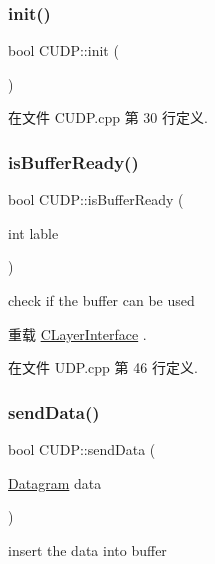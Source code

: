 \subsubsection{\texorpdfstring{init()}{init()}}
{\footnotesize\ttfamily bool C\+U\+D\+P\+::init (\begin{DoxyParamCaption}{ }\end{DoxyParamCaption})}



在文件 C\+U\+D\+P.\+cpp 第 30 行定义.

\mbox{\label{class_c_u_d_p_af595428bc531576d9859a9e0b84d03d9}} 
\subsubsection{\texorpdfstring{is\+Buffer\+Ready()}{isBufferReady()}}
{\footnotesize\ttfamily bool C\+U\+D\+P\+::is\+Buffer\+Ready (\begin{DoxyParamCaption}\item[{int}]{lable }\end{DoxyParamCaption})\hspace{0.3cm}{\ttfamily [virtual]}}

check if the buffer can be used 

重载 \hyperlink{class_c_layer_interface_a4979d7b5740c06be048e4b0f1195c8fc}{C\+Layer\+Interface} .



在文件 U\+D\+P.\+cpp 第 46 行定义.

\mbox{\label{class_c_u_d_p_a1f6e555ad4997b283e68ebfa7dc0d263}} 
\subsubsection{\texorpdfstring{send\+Data()}{sendData()}}
{\footnotesize\ttfamily bool C\+U\+D\+P\+::send\+Data (\begin{DoxyParamCaption}\item[{\hyperlink{class_datagram}{Datagram}}]{data }\end{DoxyParamCaption})\hspace{0.3cm}{\ttfamily [virtual]}}

insert the data into buffer 

